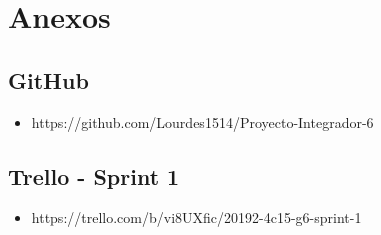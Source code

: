 \chapter{Anexos}
\section{GitHub}
\begin{itemize}
	\item https://github.com/Lourdes1514/Proyecto-Integrador-6
\end{itemize}
\section{Trello - Sprint 1}
\begin{itemize}
	\item https://trello.com/b/vi8UXfic/20192-4c15-g6-sprint-1
\end{itemize}
